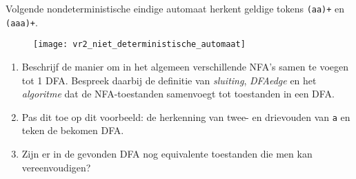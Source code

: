 \documentclass{report}
\begin{document}
	Volgende nondeterministische eindige automaat herkent geldige tokens \texttt{(aa)+} en \texttt{(aaa)+}. 
	\begin{figure}[ht]
		\centering
		\texttt{[image: vr2\_niet\_deterministische\_automaat]}
	\end{figure}
	\begin{enumerate}
		\item Beschrijf de manier om in het algemeen verschillende NFA's samen te voegen tot 1 DFA. Bespreek daarbij de definitie van \textit{sluiting}, \textit{DFAedge} en het \textit{algoritme} dat de NFA-toestanden samenvoegt tot toestanden in een DFA.
		\item Pas dit toe op dit voorbeeld: de herkenning van twee- en drievouden van \texttt{a} en teken de bekomen DFA.
		\item Zijn er in de gevonden DFA nog equivalente toestanden die men kan vereenvoudigen?
	\end{enumerate}
\end{document}
